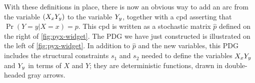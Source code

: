 With these definitions in place, there is
    now an obvious way to add an arc from the variable $({X_x Y_y})$
    to the variable ${Y_y}$, together with a cpd asserting that $\Pr(Y{=}y|X{=}x)=p$.
This cpd is written as a stochastic matrix $\hat p$
    defined on the right of \cref{fig:pyx-widget}.
The PDG we have just constructed is illustrated on the left of \cref{fig:pyx-widget}.
In addition to $\hat p$ and the new variables, this PDG
    includes the structural constraints $s_1$ and $s_2$ needed to define the variables
    ${X_x Y_y}$ and ${Y_y}$ in terms of $X$ and $Y$; they are deterministic functions,
    drawn in double-headed gray arrows.

